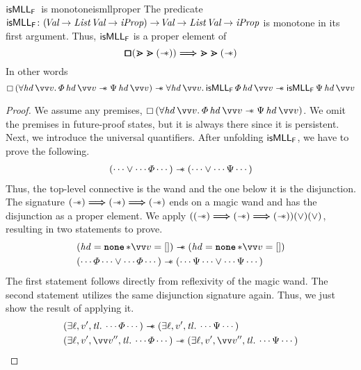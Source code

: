 \documentclass[thesis.tex]{subfiles}
\begin{document}
\begin{example}{$\textsf{\upshape isMLL}_{\textsf{\upshape F}}$\ is monotone}{ismllproper}
    The predicate $\textsf{\upshape isMLL}_{\textsf{\upshape F}}\colon (\kern-0.2em\textit{Val} \to \textit{List}\ \kern-0.2em\textit{Val} \to \textit{iProp}) \to \kern-0.2em\textit{Val} \to \textit{List}\ \kern-0.2em\textit{Val} \to \textit{iProp}$ is monotone in its first argument. Thus, $\textsf{\upshape isMLL}_{\textsf{\upshape F}}$ is a proper element of
    \[
        \pmb{\mathop{\boxempty}} (\bm{\gtrdot} \bm{\gtrdot} (\mathrel{-\!\!\ast})) \mathrel{\bm{\Longrightarrow}} \bm{\gtrdot} \bm{\gtrdot} (\mathrel{-\!\!\ast})
    \]
    In other words
    \[
        \always{(\All \hd\, \vect{v}. \pred\, \hd\, \vect{v} \wand \predB\, \hd\, \vect{v})} \wand \All \hd\, \vect{v}. \isMLL_\hopred\, \pred\, \hd\, \vect{v} \wand \isMLL_\hopred\, \predB\, \hd\, \vect{v}
    \]


    \begin{proof}
        We assume any premises, $\always{(\All \hd\, \vect{v}. \pred\, \hd\, \vect{v} \wand \predB\, \hd\, \vect{v})}$. We omit the premises in future-proof states, but it is always there since it is persistent. Next, we introduce the universal quantifiers. After unfolding $\textsf{\upshape isMLL}_{\textsf{\upshape F}}$, we have to prove the following.
        \begin{align*}
            (\cdots \lor \cdots \varPhi \cdots) \mathrel{-\!\!\ast} (\cdots \lor \cdots \Psi \cdots)
        \end{align*}
        Thus, the top-level connective is the wand and the one below it is the disjunction.
        The signature ${(\mathrel{-\!\!\ast}) \mathrel{\bm{\Longrightarrow}} (\mathrel{-\!\!\ast}) \mathrel{\bm{\Longrightarrow}} (\mathrel{-\!\!\ast})}$ ends on a magic wand and has the disjunction as a proper element. We apply $((\mathrel{-\!\!\ast}) \mathrel{\bm{\Longrightarrow}} (\mathrel{-\!\!\ast}) \mathrel{\bm{\Longrightarrow}} (\mathrel{-\!\!\ast})) (\lor) (\lor)$, resulting in two statements to prove.
        \begin{align*}
             & (\hd = \None * \vect{\val} = []) \wand (\hd = \None * \vect{\val} = [])                                \\
             & (\cdots \pred \cdots \lor \cdots  \pred \cdots) \wand (\cdots \predB \cdots \lor \cdots \predB \cdots)
        \end{align*}
        The first statement follows directly from reflexivity of the magic wand. The second statement utilizes the same disjunction signature again. Thus, we just show the result of applying it.
        \begin{align*}
             & (\Exists \loc, \val', \tl. \cdots \pred \cdots) \wand (\Exists \loc, \val', \tl. \cdots \predB \cdots)                               \\
             & (\Exists \loc, \val', \vect{\val}'', \tl. \cdots \pred \cdots) \wand (\Exists \loc, \val', \vect{\val}'', \tl. \cdots \predB \cdots)
        \end{align*}

\end{proof}
\end{example}
\end{document}
